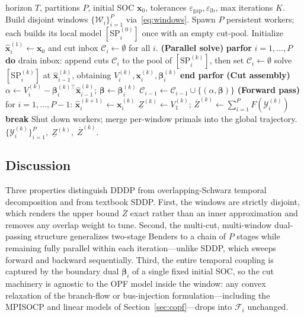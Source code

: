 \begin{algorithm}[t]
\caption{Parallel DDDP.}
\label{alg:dddp}
\begin{algorithmic}[1]
\Require horizon $T$, partitions $P$, initial SOC $\bm{x}_0$,
         tolerances $\varepsilon_{\text{gap}},\varepsilon_{\text{lb}}$,
         max iterations $K$.
\State Build disjoint windows $\{\mathcal{W}_i\}_{i=1}^{P}$
       via~\eqref{eq:windows}.
\State Spawn $P$ persistent workers; each builds its local model
       $[\mathrm{SP}_i^{(0)}]$ once with an empty cut-pool.
\State Initialize $\hat{\bm{x}}_i^{(1)}\leftarrow\bm{x}_0$ and cut inbox
       $\mathcal{C}_i\leftarrow\emptyset$ for all $i$.
   \State \textbf{(Parallel solve)}\;
          \textbf{parfor} $i = 1, \dots, P$ \textbf{do}
   \State \quad drain inbox: append cuts $\mathcal{C}_i$ to the pool of
          $[\mathrm{SP}_i^{(k)}]$, then set $\mathcal{C}_i\leftarrow\emptyset$
   \State \quad solve $[\mathrm{SP}_i^{(k)}]$ at $\hat{\bm{x}}_{i-1}^{(k)}$,
          obtaining $V_i^{(k)},\bm{x}_i^{(k)},\bm{\beta}_i^{(k)}$
   \State \textbf{end parfor}
   \State \textbf{(Cut assembly)} 
       \State $\alpha \leftarrow V_i^{(k)} -
              \bm{\beta}_i^{(k)\top}\hat{\bm{x}}_{i-1}^{(k)}$;\;\;
              $\bm{\beta} \leftarrow \bm{\beta}_i^{(k)}$
       \State $\mathcal{C}_{i-1} \leftarrow \mathcal{C}_{i-1}\cup\{(\alpha,\bm{\beta})\}$
   \EndFor
   \State \textbf{(Forward pass)} for $i=1,\dots,P{-}1$:
          $\hat{\bm{x}}_{i}^{(k+1)} \leftarrow \bm{x}_i^{(k)}$
   \State $\underline{Z}^{(k)} \leftarrow V_1^{(k)}$;\;\;
          $\overline{Z}^{(k)} \leftarrow \sum_{i=1}^{P} F(\mathcal{Y}_i^{(k)})$
       \State \textbf{break}
   \EndIf
\EndFor
\State Shut down workers; merge per-window primals into the global trajectory.
\State \Return $\{\mathcal{Y}_i^{(k)}\}_{i=1}^P,\;
                \underline{Z}^{(k)},\;\overline{Z}^{(k)}$.
\end{algorithmic}
\end{algorithm}

\subsection{Discussion}
\label{ssec:discussion}

Three properties distinguish DDDP from overlapping-Schwarz temporal
decomposition and from textbook SDDP. First, the windows are strictly
disjoint, which renders the upper bound $\overline{Z}$ exact rather than
an inner approximation and removes any overlap weight to tune. Second,
the multi-cut, multi-window dual-passing structure generalizes
two-stage Benders to a chain of $P$ stages while remaining fully
parallel within each iteration---unlike SDDP, which sweeps forward and
backward sequentially. Third, the entire temporal coupling is captured
by the boundary dual $\bm{\beta}_i$ of a single fixed initial SOC, so the
cut machinery is agnostic to the OPF model inside the window: any convex
relaxation of the branch-flow or bus-injection formulation---including
the MPISOCP and linear models of Section~\ref{sec:copf}---drops into
$\mathcal{F}_i$ unchanged.
